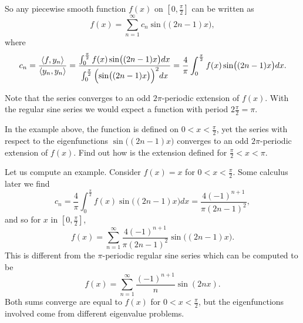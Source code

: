 \documentclass{ximera}
\begin{document}
\begin{example}
    So any piecewise smooth function $f(x)$ on $[0,\frac{\pi}{2}]$ can be written as
    \begin{equation*}
        f(x) = \sum_{n=1}^\infty c_n \sin \bigl( (2n-1)x \bigr) ,
    \end{equation*}
    where
    \begin{equation*}
        c_n = \frac{\langle f , y_n \rangle}{\langle y_n , y_n \rangle} 
        = \frac{\int_0^{\frac{\pi}{2}} f(x)  \sin \bigl( (2n-1)x \bigr)  dx }{\int_0^{\frac{\pi}{2}} {\Bigl(\sin \bigl((2n-1)x\bigr)\Bigr)}^2  dx}
        = \frac{4}{\pi} \int_0^{\frac{\pi}{2}} f(x) \sin \bigl( (2n-1)x \bigr)  dx .
    \end{equation*}
    
    Note that the series converges to an odd $2\pi$-periodic extension of $f(x)$.  With the regular sine series we would expect a function with period $2  \frac{\pi}{2} = \pi$.
    
    \begin{exercise}%
        In the example above, the function is defined on $0 < x < \frac{\pi}{2}$, yet the series with respect to the eigenfunctions $\sin \bigl( (2n-1)x \bigr)$ converges to an odd $2\pi$-periodic extension of $f(x)$. Find out how is the extension defined for $\frac{\pi}{2} < x < \pi$.
    \end{exercise}
    
    Let us compute an example. Consider $f(x) = x$ for $0 < x <  \frac{\pi}{2}$.  Some calculus later we find
    \begin{equation*}
        c_n =  \frac{4}{\pi} \int_0^{\frac{\pi}{2}} f(x) \sin \bigl( (2n-1)x \bigr)  dx 
        = \frac{4{(-1)}^{n+1}}{\pi {(2n-1)}^2} ,
    \end{equation*}
    and so for $x$ in $[0,\frac{\pi}{2}]$,
    \begin{equation*}
        f(x) = \sum_{n=1}^\infty \frac{4{(-1)}^{n+1}}{\pi {(2n-1)}^2} \sin \bigl( (2n-1)x \bigr) .
    \end{equation*}
    This is different from the $\pi$-periodic regular sine series which can be computed to be
    \begin{equation*}
        f(x) = \sum_{n=1}^\infty \frac{{(-1)}^{n+1}}{n}  \sin ( 2nx ) .
    \end{equation*}
    Both sums converge are equal to $f(x)$ for $0 < x < \frac{\pi}{2}$, but the eigenfunctions involved come from different eigenvalue problems.
\end{example}
\end{document}
